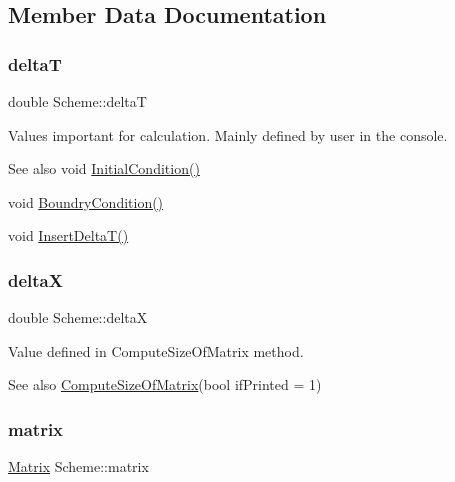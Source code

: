 \subsection{Member Data Documentation}
\mbox{\label{class_scheme_aaaf978f98d30bd96ea56a9387d1b2c5a}} 
\subsubsection{\texorpdfstring{deltaT}{deltaT}}
{\footnotesize\ttfamily double Scheme\+::deltaT\hspace{0.3cm}{\ttfamily [protected]}}

Values important for calculation. Mainly defined by user in the console. \begin{DoxySeeAlso}{See also}
void \mbox{\hyperlink{class_scheme_ad3546cda995629a2792629a072760ad2}{Initial\+Condition()}} 

void \mbox{\hyperlink{class_scheme_a36885039937c25f13c8daea654e37b97}{Boundry\+Condition()}} 

void \mbox{\hyperlink{class_scheme_ac5803e4951dc125b274f543d5037c21d}{Insert\+Delta\+T()}} 
\end{DoxySeeAlso}
\mbox{\label{class_scheme_a7491f0ce42370ab44134bf82bd0079a7}} 
\subsubsection{\texorpdfstring{deltaX}{deltaX}}
{\footnotesize\ttfamily double Scheme\+::deltaX\hspace{0.3cm}{\ttfamily [protected]}}

Value defined in Compute\+Size\+Of\+Matrix method. \begin{DoxySeeAlso}{See also}
\mbox{\hyperlink{class_scheme_a0364e328d78e84be15d293a66d946008}{Compute\+Size\+Of\+Matrix}}(bool if\+Printed = 1) 
\end{DoxySeeAlso}
\mbox{\label{class_scheme_a0e1fb8cb7e062d3f49715445a884f0e8}} 
\subsubsection{\texorpdfstring{matrix}{matrix}}
{\footnotesize\ttfamily \mbox{\hyperlink{class_matrix}{Matrix}} Scheme\+::matrix\hspace{0.3cm}{\ttfamily [protected]}}

